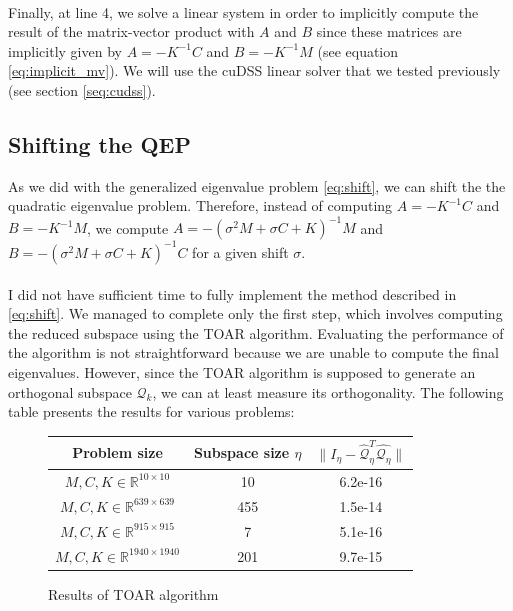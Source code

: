 \paragraph*{}
Finally, at line 4, we solve a linear system in order to implicitly compute the result of the matrix-vector product with $A$ and $B$ since these matrices are implicitly given by $A=-K^{-1}C$ and $B=-K^{-1}M$ (see equation \eqref{eq:implicit_mv}). We will use the cuDSS linear solver that we tested previously (see section \ref{seq:cudss}).

\subsection{Shifting the QEP}
As we did with the generalized eigenvalue problem \eqref{eq:shift}, we can shift the the quadratic eigenvalue problem. Therefore, instead of computing $A=-K^{-1}C$ and $B=-K^{-1}M$, we compute $A = -(\sigma^2 M + \sigma C + K)^{-1} M$ and $B = -(\sigma^2 M + \sigma C + K)^{-1} C$ for a given shift $\sigma$.

\paragraph*{}
I did not have sufficient time to fully implement the method described in \eqref{eq:shift}. We managed to complete only the first step, which involves computing the reduced subspace using the TOAR algorithm. Evaluating the performance of the algorithm is not straightforward because we are unable to compute the final eigenvalues. However, since the TOAR algorithm is supposed to generate an orthogonal subspace $\mathcal{Q}_k$, we can at least measure its orthogonality. The following table presents the results for various problems:

\begin{figure}[h]
\begin{center}
\begin{tabular}{ |c|c|c| } 
 \hline
 Problem size & Subspace size $\eta$ & $\lVert I_{\eta} - \hat{\mathcal{Q}}_{\eta}^T \hat{\mathcal{Q}_{\eta}} \rVert$ \\ 
 \hline
    $M,C,K \in \mathbb{R}^{10 \times 10}$ & 10 & 6.2e-16 \\
    $M,C,K \in \mathbb{R}^{639 \times 639}$ & 455 & 1.5e-14 \\
    $M,C,K \in \mathbb{R}^{915 \times 915}$ & 7 & 5.1e-16 \\
    $M,C,K \in \mathbb{R}^{1940 \times 1940}$ & 201 & 9.7e-15 \\
 \hline
\end{tabular}
\end{center}
\caption{Results of TOAR algorithm}
\label{tab:gs_bound}
\end{figure}

